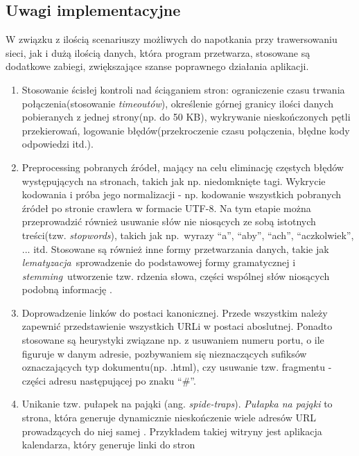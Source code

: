 
\subsection{Uwagi implementacyjne}
\label{subsec:uwagiImplement}

W związku z ilością scenariuszy możliwych do napotkania przy trawersowaniu sieci, jak i dużą ilością danych, która program przetwarza,
stosowane są dodatkowe zabiegi, zwiększające szanse poprawnego działania aplikacji.
\begin{enumerate}
    \item Stosowanie ścisłej kontroli nad ściąganiem stron: ograniczenie czasu trwania połączenia(stosowanie \emph{timeoutów}),
          określenie górnej granicy ilości danych pobieranych z jednej strony(np. do 50 KB), wykrywanie nieskończonych pętli przekierowań,
          logowanie błędów(przekroczenie czasu połączenia, błędne kody odpowiedzi itd.).
    \item Preprocessing pobranych źródeł, mający na celu eliminację częstych błędów występujących na stronach, takich jak np. niedomknięte tagi.
          Wykrycie kodowania i próba jego normalizacji - np. kodowanie wszystkich pobranych źródeł po stronie crawlera w formacie UTF-8.
          Na tym etapie można przeprowadzić również usuwanie słów nie niosących ze sobą istotnych treści(tzw. \emph{stopwords}), takich jak 
          np.~wyrazy ``a'', ``aby'', ``ach'', ``aczkolwiek'', ... itd. Stosowane są również inne formy przetwarzania danych, takie jak
          \emph{lematyzacja}~sprowadzenie do podstawowej formy  gramatycznej i 
          \emph{stemming}~utworzenie tzw. rdzenia słowa, części wspólnej słów niosących podobną informację \cite{lemStem}.
    \item Doprowadzenie linków do postaci kanonicznej. Przede wszystkim należy zapewnić przedstawienie wszystkich URLi w postaci aboslutnej. Ponadto stosowane
          są heurystyki związane np. z usuwaniem numeru portu, o ile figuruje w danym adresie, pozbywaniem się nieznaczących sufiksów oznaczających 
          typ dokumentu(np. .html), czy usuwanie tzw. fragmentu - części adresu następującej po znaku ``\#''.
    \item Unikanie tzw. pułapek na pająki (ang. \emph{spide-traps}). \emph{Pułapka na pająki} to strona, która generuje dynamicznie nieskończenie wiele 
          adresów URL prowadzących do niej samej \cite{spiderTraps}. Przykładem takiej witryny jest aplikacja kalendarza, który generuje linki do stron

\end{enumerate}
